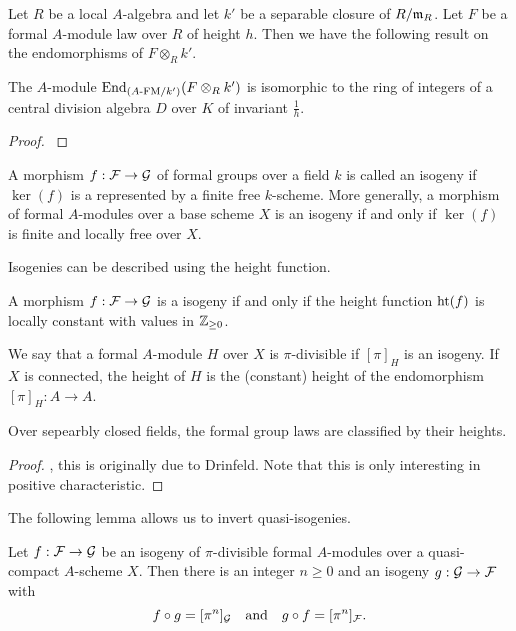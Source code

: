 Let $R$ be a local $A$-algebra and let $k'$ be a separable closure of $R/\mathfrak{m}_R$.
Let $F$ be a formal $A$-module law over $R$ of height $h$. Then we have the
following result on the endomorphisms of $F \otimes_R k'$.
\begin{lem}
  The $A$-module $\operatorname{End}_{{({A}\text-\mathrm{FM}/{k'})}}(F \otimes_R k')$ is isomorphic to the ring
  of integers of a central division algebra $D$ over $K$ of invariant $\frac 1h$.
\begin{proof}
  \cite[Proposition 1.7]{drinfel1974elliptic} 
\end{proof}
\end{lem}

\begin{defi}[Isogeny]
  A morphism $f: \mathcal{F} \to \mathcal{G}$ of formal groups over a field $k$ is called an isogeny if
  $\ker(f)$ is a represented by a finite free $k$-scheme. More generally, a
  morphism of formal $A$-modules over a base scheme $X$ is an isogeny if and
  only if $\ker(f)$ is finite and locally free over $X$. 
\end{defi}

Isogenies can be described using the height function.

\begin{lem}
  A morphism $f: \mathcal{F} \to \mathcal{G}$ is a isogeny if and only if the height 
  function $\textnormal{ht}(f)$ is locally constant with values in $\mathbb{Z}_{\geq 0}$. 
\end{lem}

\begin{defi}
  We say that a formal $A$-module $H$ over $X$ is $\pi$-divisible if 
  $[\pi]_H$ is an isogeny. If $X$ is connected, the height of $H$ is the
  (constant) height of the endomorphism $[\pi]_H: A \to A$. 
\end{defi}

\begin{lem}
  Over sepearbly closed fields, the formal group laws are classified by their 
  heights.
\begin{proof}
  \cite[Theorem 19.4.1]{hazewinkel1978formal}, this is originally due to Drinfeld.
  Note that this is only interesting in positive characteristic.
\end{proof}
\end{lem}

The following lemma allows us to invert quasi-isogenies.

\begin{lem}
  Let $f: \mathcal{F} \to \mathcal{G}$ be an isogeny of $\pi$-divisible formal $A$-modules over a
  quasi-compact  $A$-scheme $X$. Then there is an 
  integer $n \geq 0$ and an isogeny $g: \mathcal{G} \to \mathcal{F}$ with 
  \begin{equation*}
    f \circ g = [\pi^n]_{\mathcal{G}} \quad \text{and} \quad g \circ f = [\pi^n]_{\mathcal{F}}.
  \end{equation*}
\end{lem}


